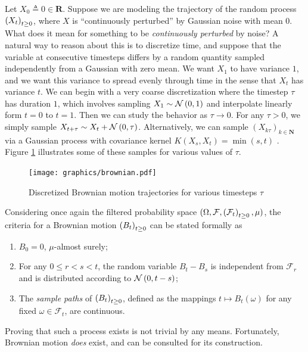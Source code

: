 Let $X_0\triangleq 0\in\mathbf{R}$. Suppose we are modeling the
trajectory of the random process $\indexedabove{t}{X}$, where $X$ is
``continuously perturbed'' by Gaussian noise with mean $0$. What does
it mean for something to be \emph{continuously perturbed} by noise? A
natural way to reason about this is to discretize time, and suppose
that the variable at consecutive timesteps differs by a random
quantity sampled independently from a Gaussian with zero
mean. We want $X_1$ to have variance $1$, and we want this variance to
spread evenly through time in the sense that $X_t$ has variance
$t$. We can begin with a very coarse discretization where the timestep
$\tau$ has duration $1$, which involves sampling
$X_1\sim\gaussian{0}{1}$ and interpolate linearly form $t=0$ to
$t=1$. Then we can study the behavior as $\tau\to 0$. For any
$\tau>0$, we simply sample $X_{t+\tau}\sim X_t +
\gaussian{0}{\tau}$. Alternatively, we can sample 
$(X_{k\tau})_{k\in\mathbf{N}}$ via a
Gaussian process with covariance kernel $K(X_s, X_t) = \min(s, t)$
\citep{williams2006gaussian}. Figure \ref{fig:brownian:viz:1}
illustrates some of these samples for various values of $\tau$.

\begin{figure}[h]
  \centering
  \texttt{[image: graphics/brownian.pdf]}
  \caption{Discretized Brownian motion trajectories for various
    timesteps $\tau$}
  \label{fig:brownian:viz:1}
\end{figure}

Considering once again the filtered probability space $(\Omega,
\mathcal{F}, \indexedabove{t}{\mathcal{F}}, \mu)$, the criteria for a
Brownian motion $\indexedabove{t}{B}$ can be stated formally as

\begin{enumerate}
\item $B_0=0$, $\mu$-almost surely;
\item For any $0\leq r<s<t$, the random variable $B_t - B_s$ is
  independent from $\mathcal{F}_r$ and is distributed according to
  $\gaussian{0}{t-s}$;
\item The \emph{sample paths} of $\indexedabove{t}{B}$, defined as the
  mappings $t\mapsto B_t(\omega)$ for any fixed
  $\omega\in\mathcal{F}_t$, are continuous.
\end{enumerate}

Proving that such a process exists is not trivial by any
means. Fortunately, Brownian motion \emph{does} exist, and
\citet{le2016brownian} can be consulted for its construction.

